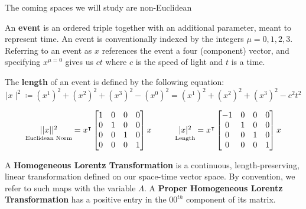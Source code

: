 \documentclass[compress,aspectratio=169,10pt,usenames,dvipsnames]{beamer}
\begin{document}
\begin{frame}
\vfill
The coming spaces we will study are non-Euclidean
\vfill
\begin{definition}
	An \textbf{event} is an ordered triple together with an additional parameter, meant to represent time. An event is conventionally indexed by the integers $\mu = 0,1,2,3$. Referring to an event as $x$ references the event a four (component) vector, and specifying $x^{\mu=0}$ gives us $ct$ where $c$ is the speed of light and $t$ is a time. 
\end{definition}
\vfill
\begin{definition}
	The \textbf{length} of an event is defined by the following equation:
$$\mid x\mid^2 \coloneq (x^1)^2+(x^2)^2+(x^3)^2 - (x^0)^2 = (x^1)^2+(x^2)^2+(x^3)^2 - c^2t^2$$
\end{definition}
\end{frame}
%
%
\begin{frame}
\vfill
$$\begin{array}{c@{\hskip 1cm}c}

	\underset{\text{Euclidean Norm}}{||x||^2} = x^\intercal\begin{bmatrix}
													1 & 0 & 0 & 0\\
													 0 & 1 & 0 & 0\\
													0 & 0 & 1 & 0\\
													0 & 0 & 0 & 1
												\end{bmatrix}x

&
	\underset{\text{Length}}{|x|^2} = x^\intercal\begin{bmatrix}
													-1 & 0 & 0 & 0\\
													 0 & 1 & 0 & 0\\
													0 & 0 & 1 & 0\\
													0 & 0 & 0 & 1
												\end{bmatrix}x

\end{array}$$
\vfill
\begin{definition}
	A \textbf{Homogeneous Lorentz Transformation} is a continuous, length-preserving, linear transformation defined on our space-time vector space. By convention, we refer to such maps with the variable $\Lambda$. A \textbf{Proper Homogeneous Lorentz Transformation} has a positive entry in the $00^{th}$ component of its matrix.
\end{definition}
\vfill

\end{frame}
\end{document}
